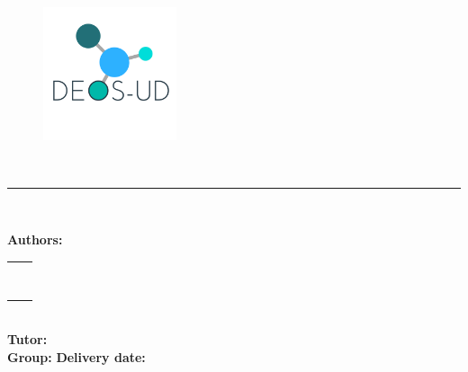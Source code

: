 \begin{center}
\begin{figure}[!tbp]
    \centering
         \includegraphics[width=0.35\textwidth]{./doc_config/images/logo2.png}
\end{figure}

\vspace{2cm}

{\fontsize{25pt}{20pt}\selectfont \ProjectName}\\ \vspace{0.3cm}
{\fontsize{22pt}{20pt}\selectfont \ProjectsubName}


\vspace{10pt}



\textcolor{UPC_blue}{\rule{\textwidth}{.6pt}}

{\Large \DocTypeI}\\
{\Large \DocTypeII}

\end{center}

\vspace{20pt}

\textbf{Authors:}\vspace{7pt}

\begin{tabular}{ll}
	\Studi    \hspace*{30pt} & \Studix   \\
	\Studii   \hspace*{30pt} & \Studx   \\
	\Studiii  \hspace*{30pt} & \Studxi   \\
	\Studiv   \hspace*{30pt} & \Studxii \\
	\Studv    \hspace*{30pt} & \Studxiii    \\
	\Studvi   \hspace*{30pt} & \Studxiv  \\
	\Studvii  \hspace*{30pt} & \Studxv  \\
	\Studviii \hspace*{30pt} & \Studxvi  \\
\end{tabular}\\

\vspace{10pt}
\textbf{Tutor:} \Director\\

\vspace{10pt}
\textbf{Group:} \Group \hspace*{160pt} \textbf{Delivery date:} \DocDate
